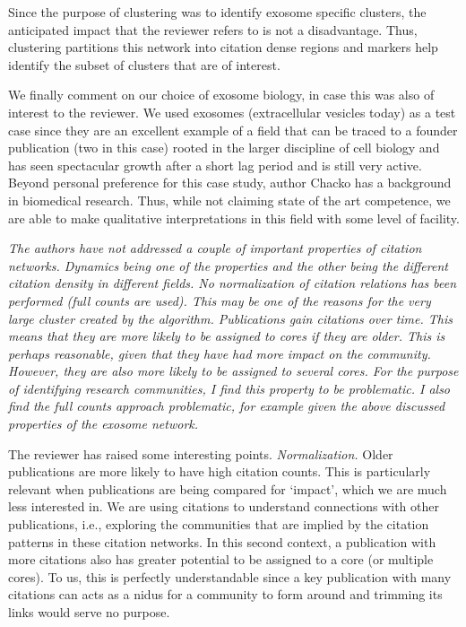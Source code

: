 \documentclass[11pt, oneside]{article}   	%
\begin{document}
Since the purpose of clustering was to identify exosome specific clusters, the anticipated impact that the reviewer refers to is not a disadvantage. Thus, clustering partitions this network into citation dense regions and markers help identify the subset of clusters that are of interest. 

We finally comment on our choice of exosome biology, in case this was also of interest to the reviewer. We used exosomes (extracellular vesicles today) as a test case since they are an excellent example of a field that can be traced to a founder publication (two in this case) rooted in the larger discipline of cell biology and has seen spectacular growth after a short lag period and is still very active. Beyond personal preference for this case study, author Chacko has a background in biomedical research. Thus, while not claiming state of the art competence, we are able to make qualitative interpretations in this field with some level of facility.  

\emph{The authors have not addressed a couple of important properties of citation networks. Dynamics being one of the properties and the other being the different citation density in different fields. No normalization of citation relations has been performed (full counts are used). This may be one of the reasons for the very large cluster created by the algorithm. Publications gain citations over time. This means that they are more likely to be assigned to cores if they are older. This is perhaps reasonable, given that they have had more impact on the community. However, they are also more likely to be assigned to several cores. For the purpose of identifying research communities, I find this property to be problematic. I also find the full counts approach problematic, for example given the above discussed properties of the exosome network.}

The reviewer has raised some interesting points. \emph{Normalization.} Older publications are more likely to have high citation counts. This is particularly relevant when publications are being compared for `impact', which we are much less interested in. We are using citations to understand connections with other publications, i.e., exploring the communities that are implied by the citation patterns in these citation networks. In this second context, a publication with more citations also has greater potential to be assigned to a core (or multiple cores). To us, this is perfectly understandable since a key publication with many citations can acts as a nidus for a community to form around and trimming its links would serve no purpose.  
\end{document}

